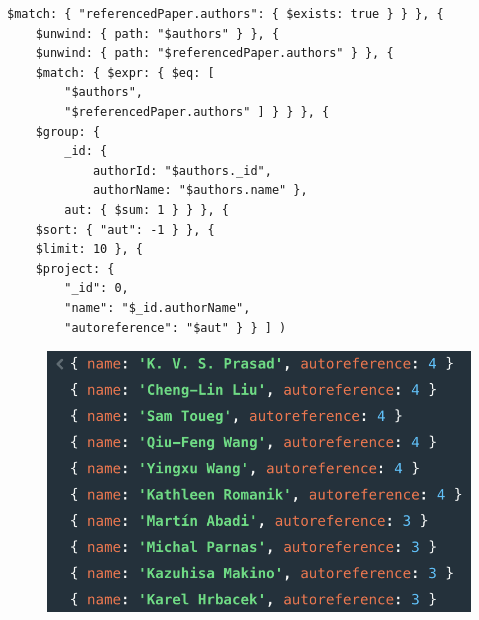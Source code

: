 \begin{enumerate}
\begin{lstlisting}[label={lst:lstlisting75}]
    $match: { "referencedPaper.authors": { $exists: true } } }, {
    $unwind: { path: "$authors" } }, {
    $unwind: { path: "$referencedPaper.authors" } }, {
    $match: { $expr: { $eq: [
        "$authors",
        "$referencedPaper.authors" ] } } }, {
    $group: {
        _id: {
            authorId: "$authors._id",
            authorName: "$authors.name" },
        aut: { $sum: 1 } } }, {
    $sort: { "aut": -1 } }, {
    $limit: 10 }, {
    $project: {
        "_id": 0,
        "name": "$_id.authorName",
        "autoreference": "$aut" } } ] )
    \end{lstlisting}
    \begin{figure}[H]
        \begin{center}
            \includegraphics[width=0.6\linewidth]{ImagesMongoDB/query17mongo}
            \label{fig:query17mongo}
        \end{center}
    \end{figure}
\end{enumerate}
